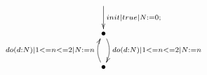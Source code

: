 $\xymatrix{
   \ar[d]^{init | true | N:=0;} \\
   \bullet \ar@/^/[d]^{do(d:N) | 1 <= n <= 2 | N:=n} \\
   \bullet \ar@/^/[u]^{do(d:N) | 1 <= n <= 2 | N:=n}}$